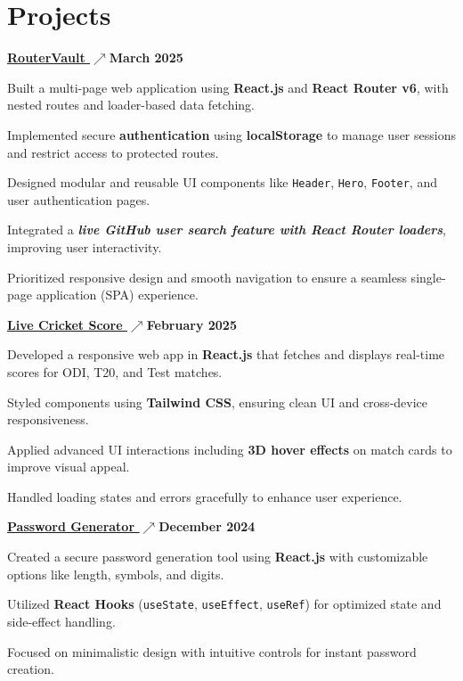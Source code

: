 \documentclass[letterpaper,10pt]{article}
\newcommand{\heading}[2]{
  \hspace{10pt}#1\hfill#2\\
}
\newcommand{\headingBf}[2]{
  \heading{\textbf{#1}}{\textbf{#2}}
}
\newenvironment{resume_list}{
  \vspace{-7pt}
  \begin{itemize}[itemsep=-2px, parsep=1pt, leftmargin=30pt]
}{
  \end{itemize}
}
\begin{document}

  \section{Projects}

 \headingBf {\underline{\href{https://legendary-bonbon-8df4a1.netlify.app/}{RouterVault \(\nearrow\)}}}{March 2025}  \vspace{4pt}
\begin{resume_list}
    \item Built a multi-page web application using \textbf{React.js} and \textbf{React Router v6}, with nested routes and loader-based data fetching.
    \item Implemented secure \textbf{authentication} using \textbf{localStorage} to manage user sessions and restrict access to protected routes.
    \item Designed modular and reusable UI components like \texttt{Header}, \texttt{Hero}, \texttt{Footer}, and user authentication pages.
    \item Integrated a \textbf{\textit{live GitHub user search feature with React Router loaders}}, improving user interactivity.
    \item Prioritized responsive design and smooth navigation to ensure a seamless single-page application (SPA) experience.
\end{resume_list}

  
\headingBf {\underline{\href{https://moonlit-lolly-0ff123.netlify.app/}{Live Cricket Score \(\nearrow\)}}}{February 2025}  \vspace{4pt}
\begin{resume_list}
    \item Developed a responsive web app in \textbf{React.js} that fetches and displays real-time scores for ODI, T20, and Test matches.
    \item Styled components using \textbf{Tailwind CSS}, ensuring clean UI and cross-device responsiveness.
    \item Applied advanced UI interactions including \textbf{3D hover effects} on match cards to improve visual appeal.
    \item Handled loading states and errors gracefully to enhance user experience.
\end{resume_list}


\headingBf {\underline{\href{https://chipper-pika-ccd3fb.netlify.app/}{Password Generator \(\nearrow\)}}}{December 2024}  \vspace{4pt}
\begin{resume_list}
    \item Created a secure password generation tool using \textbf{React.js} with customizable options like length, symbols, and digits.
    \item Utilized \textbf{React Hooks} (\texttt{useState}, \texttt{useEffect}, \texttt{useRef}) for optimized state and side-effect handling.
    \item Focused on minimalistic design with intuitive controls for instant password creation.
\end{resume_list}
\end{document}
